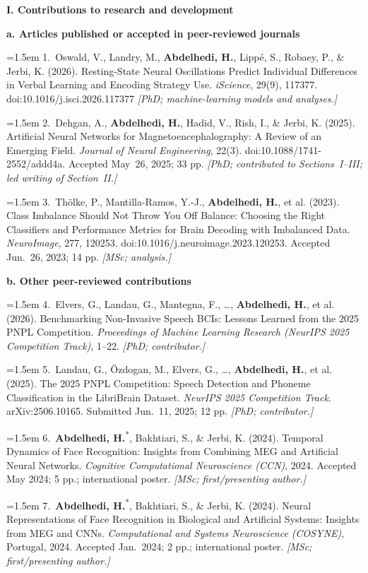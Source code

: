 \documentclass[12pt,letterpaper]{article}
\newcommand{\presenting}{\textsuperscript{*}}
\newcommand{\partheading}[1]{%
  \noindent\textbf{#1}\par\vspace{1pt}%
}
\newcommand{\nsercsubheading}[1]{%
  \Needspace{2\baselineskip}%
  \vspace{3pt}%
  \noindent\textbf{#1}\par\vspace{0pt}%
}
\newcommand{\nsercitem}[2]{%
  \noindent\hangindent=1.5em\hangafter=1 #1 \textit{[#2]}\par%
  \vspace{0pt}%
}
\begin{document}
\partheading{I. Contributions to research and development}

\nsercsubheading{a. Articles published or accepted in peer-reviewed journals}

\nsercitem{1.~Oswald, V., Landry, M., \textbf{Abdelhedi, H.}, Lippé, S., Robaey,
  P., \& Jerbi, K. (2026). Resting-State Neural Oscillations Predict Individual
  Differences in Verbal Learning and Encoding Strategy Use.
  \textit{iScience}, 29(9), 117377. doi:10.1016/j.isci.2026.117377}{PhD; machine-learning models
  and analyses.}

\nsercitem{2.~Dehgan, A., \textbf{Abdelhedi, H.}, Hadid, V., Rish, I., \& Jerbi, K.
  (2025). Artificial Neural Networks for Magnetoencephalography: A Review of an
  Emerging Field. \textit{Journal of Neural Engineering}, 22(3).
  doi:10.1088/1741-2552/addd4a. Accepted May~26, 2025; 33 pp.}{PhD; contributed to Sections~I--III; led writing
  of Section~II.}

\nsercitem{3.~Thölke, P., Mantilla-Ramos, Y.-J., \textbf{Abdelhedi, H.}, et al.
  (2023). Class Imbalance Should Not Throw You Off Balance: Choosing the Right
  Classifiers and Performance Metrics for Brain Decoding with Imbalanced Data.
  \textit{NeuroImage}, 277, 120253. doi:10.1016/j.neuroimage.2023.120253.
  Accepted Jun.~26, 2023; 14 pp.}{MSc; analysis.}

\nsercsubheading{b. Other peer-reviewed contributions}

\nsercitem{4.~Elvers, G., Landau, G., Mantegna, F., \ldots, \textbf{Abdelhedi, H.},
  et al. (2026). Benchmarking Non-Invasive Speech BCIs: Lessons Learned from the 2025
  PNPL Competition. \textit{Proceedings of Machine Learning Research (NeurIPS 2025
  Competition Track)}, 1--22.}{PhD; contributor.}

\nsercitem{5.~Landau, G., Özdogan, M., Elvers, G., \ldots, \textbf{Abdelhedi, H.},
  et al. (2025). The 2025 PNPL Competition: Speech Detection and Phoneme
  Classification in the LibriBrain Dataset. \textit{NeurIPS 2025 Competition Track}.
  arXiv:2506.10165. Submitted Jun.~11, 2025; 12 pp.}{PhD; contributor.}

\nsercitem{6.~\textbf{Abdelhedi, H.}\presenting, Bakhtiari, S., \& Jerbi, K.
  (2024). Temporal Dynamics of Face Recognition: Insights from Combining MEG and
  Artificial Neural Networks. \textit{Cognitive Computational Neuroscience (CCN)}, 2024.
  Accepted May 2024; 5 pp.; international poster.}{MSc; first/presenting author.}

\nsercitem{7.~\textbf{Abdelhedi, H.}\presenting, Bakhtiari, S., \& Jerbi, K.
  (2024). Neural Representations of Face Recognition in Biological and Artificial
  Systems: Insights from MEG and CNNs. \textit{Computational and Systems
  Neuroscience (COSYNE)}, Portugal, 2024. Accepted Jan.~2024; 2 pp.; international poster.}{MSc;
  first/presenting author.}
\end{document}
